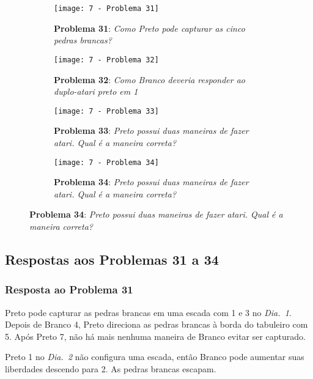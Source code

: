 \begin{figure}[h!]
    \centering
    \captionsetup{justification=raggedright,singlelinecheck=false}
    \begin{subfigure}[t]{.45\textwidth}
        \texttt{[image: 7 - Problema 31]}
        \caption*{\textbf{Problema 31}: \emph{Como Preto pode capturar as cinco pedras brancas?}}
    \end{subfigure}
    \hspace{1cm}
    \begin{subfigure}[t]{.45\textwidth}
        \texttt{[image: 7 - Problema 32]}
        \caption*{\textbf{Problema 32}: \emph{Como Branco deveria responder ao duplo-atari preto em 1}}
    \end{subfigure}
    \par\bigskip
    \begin{subfigure}[t]{.45\textwidth}
        \texttt{[image: 7 - Problema 33]}
        \caption*{\textbf{Problema 33}: \emph{Preto possui duas maneiras de fazer atari. Qual é a maneira correta?}}
    \end{subfigure}
    \hspace{1cm}
    \begin{subfigure}[t]{.45\textwidth}
        \texttt{[image: 7 - Problema 34]}
        \caption*{\textbf{Problema 34}: \emph{Preto possui duas maneiras de fazer atari. Qual é a maneira correta?}}
    \end{subfigure}
\end{figure}

\pagebreak

\subsection{Respostas aos Problemas 31 a 34}

\subsubsection*{Resposta ao Problema 31}

Preto pode capturar as pedras brancas em uma escada com 1 e 3 no \emph{Dia.\@~1}. Depois de Branco 4, Preto direciona as pedras brancas à borda do tabuleiro com 5. Após Preto 7, não há mais nenhuma maneira de Branco evitar ser capturado.

Preto 1 no \emph{Dia.\@~2} não configura uma escada, então Branco pode aumentar suas liberdades descendo para 2. As pedras brancas escapam.

